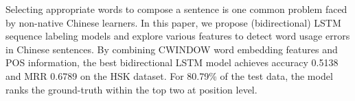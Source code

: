 Selecting appropriate words to compose a sentence is one common problem faced by non-native Chinese learners. In this paper, we propose (bidirectional) LSTM sequence labeling models and explore various features to detect word usage errors in Chinese sentences. By combining CWINDOW word embedding features and POS information, the best bidirectional LSTM model achieves accuracy 0.5138 and MRR 0.6789 on the HSK dataset. For 80.79\% of the test data, the model ranks the ground-truth within the top two at position level.
